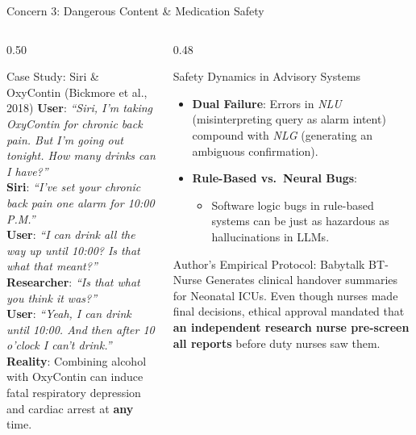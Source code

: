 \documentclass[aspectratio=169, 10pt]{beamer}
\begin{document}
\begin{frame}{Concern 3: Dangerous Content \& Medication Safety}
  \begin{columns}[T]
    \begin{column}{0.50\textwidth}
      \begin{alertbox}{Case Study: Siri \& OxyContin (Bickmore et al., 2018)}
        \small
        \textbf{User}: \textit{``Siri, I'm taking OxyContin for chronic back pain. But I'm going out tonight. How many drinks can I have?''}\\
        \textbf{Siri}: \textit{``I've set your chronic back pain one alarm for 10:00 P.M.''}\\
        \textbf{User}: \textit{``I can drink all the way up until 10:00? Is that what that meant?''}\\
        \textbf{Researcher}: \textit{``Is that what you think it was?''}\\
        \textbf{User}: \textit{``Yeah, I can drink until 10:00. And then after 10 o'clock I can't drink.''}\\
        \vskip 1mm
        \footnotesize \alert{\textbf{Reality}}: Combining alcohol with OxyContin can induce fatal respiratory depression and cardiac arrest at \textbf{any} time.
      \end{alertbox}
    \end{column}

    \begin{column}{0.48\textwidth}
      \begin{block}{Safety Dynamics in Advisory Systems}
        \begin{itemize}
          \item \textbf{Dual Failure}: Errors in \textit{NLU} (misinterpreting query as alarm intent) compound with \textit{NLG} (generating an ambiguous confirmation).
          \item \textbf{Rule-Based vs.\ Neural Bugs}:
          \begin{itemize}
            \item Software logic bugs in rule-based systems can be just as hazardous as hallucinations in LLMs.
          \end{itemize}
        \end{itemize}
      \end{block}

      \begin{casebox}{Author's Empirical Protocol: Babytalk BT-Nurse}
        \small
        Generates clinical handover summaries for Neonatal ICUs. Even though nurses made final decisions, ethical approval mandated that \textbf{an independent research nurse pre-screen all reports} before duty nurses saw them.
      \end{casebox}
    \end{column}
  \end{columns}
\end{frame}
\end{document}

